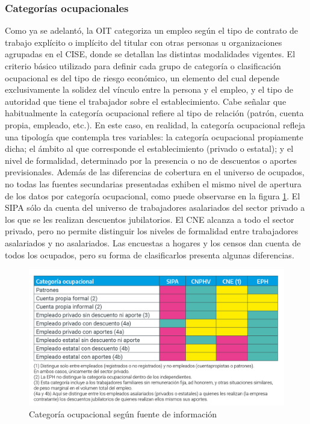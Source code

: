 \documentclass[
  openany]{book}
\begin{document}
\hypertarget{categoruxedas-ocupacionales}{%
\subsubsection{Categorías ocupacionales}\label{categoruxedas-ocupacionales}}

Como ya se adelantó, la OIT categoriza un empleo según el tipo de contrato de trabajo explícito o implícito del titular con otras personas u organizaciones agrupadas en el CISE, donde se detallan las distintas modalidades vigentes.
El criterio básico utilizado para definir cada grupo de categoría o clasificación ocupacional es del tipo de riesgo económico, un elemento del cual depende exclusivamente la solidez del vínculo entre la persona y el empleo, y el tipo de autoridad que tiene el trabajador sobre el establecimiento.
Cabe señalar que habitualmente la categoría ocupacional refiere al tipo de relación (patrón, cuenta propia, empleado, etc.).
En este caso, en realidad, la categoría ocupacional refleja una tipología que contempla tres variables: la categoría ocupacional propiamente dicha; el ámbito al que corresponde el establecimiento (privado o estatal); y el nivel de formalidad, determinado por la presencia o no de descuentos o aportes previsionales.
Además de las diferencias de cobertura en el universo de ocupados, no todas las fuentes secundarias presentadas exhiben el mismo nivel de apertura de los datos por categoría ocupacional, como puede observarse en la figura \ref{fig:empleofuentes3}.
El SIPA sólo da cuenta del universo de trabajadores asalariados del sector privado a los que se les realizan descuentos jubilatorios.
El CNE alcanza a todo el sector privado, pero no permite distinguir los niveles de formalidad entre trabajadores asalariados y no asalariados.
Las encuestas a hogares y los censos dan cuenta de todos los ocupados, pero su forma de clasificarlos presenta algunas diferencias.

\begin{figure}

{\centering \includegraphics[width=0.8\linewidth]{imagenes/figura3.3} 

}

\caption{Categoría ocupacional según fuente de información}\label{fig:empleofuentes3}
\end{figure}
\end{document}
